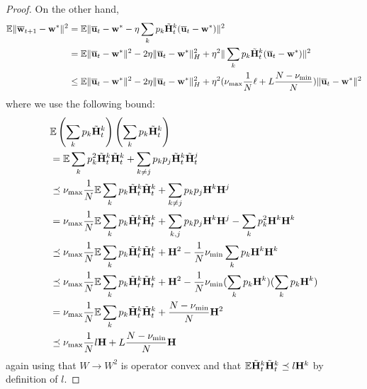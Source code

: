 \begin{proof}
	On the other hand, 
	\begin{align*}
	\mathbb{E}\|{\overline{\mathbf{w}}}_{t+1}-{\mathbf{w}}^{\ast}\|^{2} & =\mathbb{E}\|{\overline{\mathbf{u}}}_{t}-{\mathbf{w}}^{\ast}-\eta\sum_{k}p_{k}\tilde{{\mathbf{H}}}_{t}^{k}({\overline{\mathbf{u}}}_{t}-{\mathbf{w}}^{\ast})\|^{2}\\
	& =\mathbb{E}\|{\overline{\mathbf{u}}}_{t}-{\mathbf{w}}^{\ast}\|^{2}-2\eta\|{\overline{\mathbf{u}}}_{t}-{\mathbf{w}}^{\ast}\|_{H}^{2}+\eta^{2}\|\sum_{k}p_{k}\tilde{{\mathbf{H}}}_{t}^{k}({\overline{\mathbf{u}}}_{t}-{\mathbf{w}}^{\ast})\|^{2}\\
	& \leq\mathbb{E}\|{\overline{\mathbf{u}}}_{t}-{\mathbf{w}}^{\ast}\|^{2}-2\eta\|{\overline{\mathbf{u}}}_{t}-{\mathbf{w}}^{\ast}\|_{H}^{2}+\eta^{2}(\nu_{\max}\frac{1}{N}\ell+L\frac{N-\nu_{\min}}{N})\|{\overline{\mathbf{u}}}_{t}-{\mathbf{w}}^{\ast}\|^{2}
	\end{align*}
	where we use the following bound: 
	\begin{align*}
	& \mathbb{E}\left(\sum_{k}p_{k}\tilde{{\mathbf{H}}}_{t}^{k}\right)\left(\sum_{k}p_{k}\tilde{{\mathbf{H}}}_{t}^{k}\right)\\
	& =\mathbb{E}\sum_{k}p_{k}^{2}\tilde{{\mathbf{H}}}_{t}^{k}\tilde{{\mathbf{H}}}_{t}^{k}+\sum_{k\neq j}p_{k}p_{j}\tilde{{\mathbf{H}}}_{t}^{k}\tilde{{\mathbf{H}}}_{t}^{j}\\
	& \preceq\nu_{\max}\frac{1}{N}\mathbb{E}\sum_{k}p_{k}\tilde{{\mathbf{H}}}_{t}^{k}\tilde{{\mathbf{H}}}_{t}^{k}+\sum_{k\neq j}p_{k}p_{j}{\mathbf{H}}^{k}{\mathbf{H}}^{j}\\
	& =\nu_{\max}\frac{1}{N}\mathbb{E}\sum_{k}p_{k}\tilde{{\mathbf{H}}}_{t}^{k}\tilde{{\mathbf{H}}}_{t}^{k}+\sum_{k,j}p_{k}p_{j}{\mathbf{H}}^{k}{\mathbf{H}}^{j}-\sum_{k}p_{k}^{2}{\mathbf{H}}^{k}{\mathbf{H}}^{k}\\
	& \preceq\nu_{\max}\frac{1}{N}\mathbb{E}\sum_{k}p_{k}\tilde{{\mathbf{H}}}_{t}^{k}\tilde{{\mathbf{H}}}_{t}^{k}+{\mathbf{H}}^{2}-\frac{1}{N}\nu_{\min}\sum_{k}p_{k}{\mathbf{H}}^{k}{\mathbf{H}}^{k}\\
	& \preceq\nu_{\max}\frac{1}{N}\mathbb{E}\sum_{k}p_{k}\tilde{{\mathbf{H}}}_{t}^{k}\tilde{{\mathbf{H}}}_{t}^{k}+{\mathbf{H}}^{2}-\frac{1}{N}\nu_{\min}(\sum_{k}p_{k}{\mathbf{H}}^{k})(\sum_{k}p_{k}{\mathbf{H}}^{k})\\
	& =\nu_{\max}\frac{1}{N}\mathbb{E}\sum_{k}p_{k}\tilde{{\mathbf{H}}}_{t}^{k}\tilde{{\mathbf{H}}}_{t}^{k}+\frac{N-\nu_{\min}}{N}{\mathbf{H}}^{2}\\
	& \preceq\nu_{\max}\frac{1}{N}l{\mathbf{H}}+L\frac{N-\nu_{\min}}{N}{\mathbf{H}}
	\end{align*}
	again using that $W\rightarrow W^{2}$ is operator convex and that
	$\mathbb{E}\tilde{{\mathbf{H}}}_{t}^{k}\tilde{{\mathbf{H}}}_{t}^{k}\preceq l{\mathbf{H}}^{k}$ by definition
	of $l$. 
	

\end{proof}

